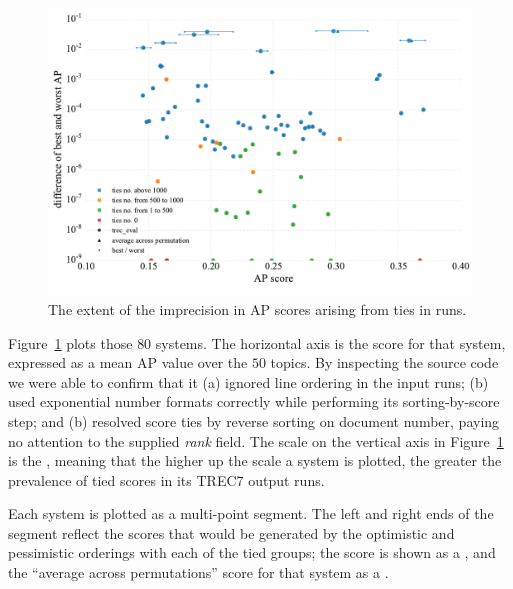 \begin{figure}[t!]
\centering
\includegraphics[width=1\textwidth]{figs/fig-trec7-ap-scores.pdf}
\caption{The extent of the imprecision in AP scores arising from ties
in runs.
{}
\label{fig-trec7-ap-scores}}
\end{figure}

Figure~\ref{fig-trec7-ap-scores} plots those $80$ systems.
The horizontal axis is the {\treceval} score for that system,
expressed as a mean AP value over the $50$ topics.
By inspecting the {\treceval} source code we were able to confirm
that it (a) ignored line ordering in the input runs; (b) used
exponential number formats correctly while performing its
sorting-by-score step; and (b) resolved score ties by reverse sorting
on document number, paying no attention to the supplied {\emph{rank}}
field.
The scale on the vertical axis in Figure~\ref{fig-trec7-ap-scores} is
the {}, meaning that the higher up the scale a
system is plotted, the greater the prevalence of tied scores in its
TREC7 output runs.

Each system is plotted as a multi-point segment.
The left and right ends of the segment reflect the scores that would
be generated by the optimistic and pessimistic orderings with each of
the tied groups; the {\treceval} score is shown as a
{}, and the ``average across permutations'' score
for that system as a {}.
{}



{}
{}

